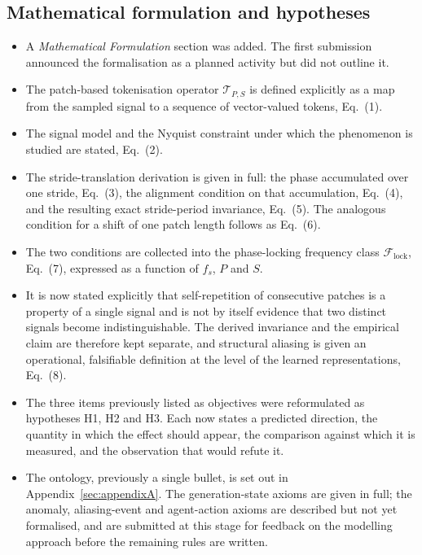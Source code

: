 \subsection{Mathematical formulation and hypotheses}
\begin{itemize}
  \item A \emph{Mathematical Formulation} section was added. The first
        submission announced the formalisation as a planned activity but did
        not outline it.
  \item The patch-based tokenisation operator $\mathcal{T}_{P,S}$ is defined
        explicitly as a map from the sampled signal to a sequence of
        vector-valued tokens, Eq.~(1).
  \item The signal model and the Nyquist constraint under which the phenomenon
        is studied are stated, Eq.~(2).
  \item The stride-translation derivation is given in full: the phase
        accumulated over one stride, Eq.~(3), the alignment condition on that
        accumulation, Eq.~(4), and the resulting exact stride-period
        invariance, Eq.~(5). The analogous condition for a shift of one patch
        length follows as Eq.~(6).
  \item The two conditions are collected into the phase-locking frequency class
        $\mathcal{F}_{\mathrm{lock}}$, Eq.~(7), expressed as a function of
        $f_s$, $P$ and $S$.
  \item It is now stated explicitly that self-repetition of consecutive patches
        is a property of a single signal and is not by itself evidence that two
        distinct signals become indistinguishable. The derived invariance and
        the empirical claim are therefore kept separate, and structural
        aliasing is given an operational, falsifiable definition at the level
        of the learned representations, Eq.~(8).
  \item The three items previously listed as objectives were reformulated as
        hypotheses H1, H2 and H3. Each now states a predicted direction, the
        quantity in which the effect should appear, the comparison against
        which it is measured, and the observation that would refute it.
  \item The ontology, previously a single bullet, is set out in
        Appendix~\ref{sec:appendixA}. The generation-state axioms are given in
        full; the anomaly, aliasing-event and agent-action axioms are described
        but not yet formalised, and are submitted at this stage for feedback on
        the modelling approach before the remaining rules are written.
\end{itemize}

